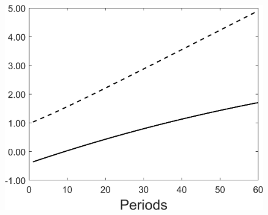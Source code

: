\begin{figure}[h!!]
\begin{minipage}[]{0.32\textwidth}
\end{minipage}
\begin{minipage}[]{0.32\textwidth}
	\includegraphics[width=1\textwidth]{../codding_model/Own/figures/Rep_agent/staticRam_LF_separate_welfare_periods59_eppsilon0.40_zeta1.40_Ad08_Ac04_thetac0.70_thetad0.56_HetGrowth1_tauul0.181_util0_withtarget0_lgd0.png}
\end{minipage}
\end{figure}

